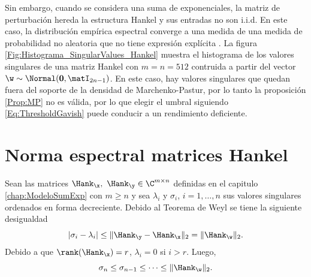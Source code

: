 	Sin embargo, cuando se considera una suma de exponenciales, la matriz de perturbación hereda la estructura Hankel y sus entradas no son i.i.d. En este caso, la distribución empírica espectral converge a una medida de una medida de probabilidad no aleatoria que no tiene expresión explícita \cite{Bryc2006}. La figura \ref{Fig:Histograma_SingularValues_Hankel} muestra el histograma de los valores singulares de una matriz Hankel con $m=n=512$ contruida a partir del vector $\w\sim\Normal(\mathbf{0},\matI_{2n-1})$. En este caso, hay valores singulares que quedan fuera del soporte de la densidad de Marchenko-Pastur, por lo tanto la proposición \eqref{Prop:MP} no es válida, por lo que elegir el umbral siguiendo \eqref{Eq:ThresholdGavish} puede conducir a un rendimiento deficiente. 
		
	 
	\section{Norma espectral matrices  Hankel}
	
		Sean las matrices $\Hank_{\x},\ \Hank_{\y}\in\C^{m\times n}$ definidas en el capitulo \eqref{chap:ModeloSumExp} con $m\ge n$ y sea  $\lambda_i$ y $\sigma_i$, $i = 1,\ldots,n$ sus valores singulares ordenados en forma decreciente. Debido al Teorema de Weyl se tiene la siguiente desigualdad
		\begin{equation}
			|\sigma_i-\lambda_i|\le \|\Hank_{\y} - \Hank_{\x}\|_2 = \|\Hank_{\w}\|_2.
			\label{Eq:WeylInequality}
		\end{equation}
		Debido a que $\rank(\Hank_{\x})=r$, $\lambda_i=0$ si $i>r$. Luego,
		\begin{equation}
			\sigma_n\le\sigma_{n-1}\le \cdots \le \|\Hank_{\w}\|_2.
			\label{Eq:WeylInequality2}
		\end{equation}
		
